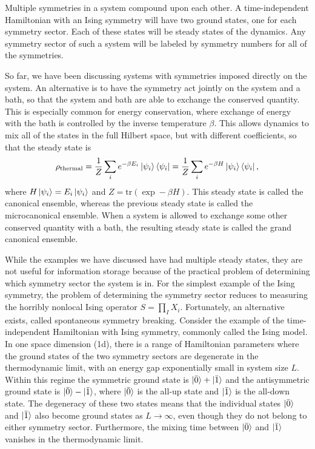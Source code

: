 Multiple symmetries in a system compound upon each other. A time-independent Hamiltonian with an Ising symmetry will have two ground states, one for each symmetry sector. Each of these states will be steady states of the dynamics. Any symmetry sector of such a system will be labeled by symmetry numbers for all of the symmetries.

So far, we have been discussing systems with symmetries imposed directly on the system. An alternative is to have the symmetry act jointly on the system and a bath, so that the system and bath are able to exchange the conserved quantity. This is especially common for energy conservation, where exchange of energy with the bath is controlled by the inverse temperature $\beta$. This allows dynamics to mix all of the states in the full Hilbert space, but with different coefficients, so that the steady state is
\begin{equation}
\rho_\text{thermal} = \frac{1}{Z} \sum_i e^{-\beta E_i} \ket{\psi_i} \bra{\psi_i} = \frac{1}{Z} \sum_i e^{-\beta H} \ket{\psi_i} \bra{\psi_i},
\end{equation}
where $H\ket{\psi_i} = E_i \ket{\psi_i}$ and $Z = \text{tr}(\exp -\beta H)$. This steady state is called the canonical ensemble, whereas the previous steady state is called the microcanonical ensemble. When a system is allowed to exchange some other conserved quantity with a bath, the resulting steady state is called the grand canonical ensemble. 

While the examples we have discussed have had multiple steady states, they are not useful for information storage because of the practical problem of determining which symmetry sector the system is in. For the simplest example of the Ising symmetry, the problem of determining the symmetry sector reduces to measuring the horribly nonlocal Ising operator $S = \prod_I X_i$. Fortunately, an alternative exists, called spontaneous symmetry breaking. Consider the example of the time-independent Hamiltonian with Ising symmetry, commonly called the Ising model. In one space dimension (1d), there is a range of Hamiltonian parameters where the ground states of the two symmetry sectors are degenerate in the thermodynamic limit, with an energy gap exponentially small in system size $L$. Within this regime the symmetric ground state is $\ket{\bar{0}}+\ket{\bar{1}}$ and the antisymmetric ground state is $\ket{\bar{0}}-\ket{\bar{1}}$, where $\ket{\bar{0}}$ is the all-up state and $\ket{\bar{1}}$ is the all-down state. The degeneracy of these two states means that the individual states $\ket{\bar{0}}$ and $\ket{\bar{1}}$ also become ground states as $L\to \infty$, even though they do not belong to either symmetry sector. Furthermore, the mixing time between $\ket{\bar{0}}$ and $\ket{\bar{1}}$ vanishes in the thermodynamic limit.

